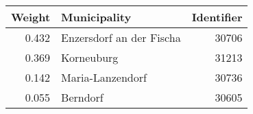 
\begin{tabular}{rlr}
\toprule
Weight & Municipality & Identifier\\
\midrule
0.432 & Enzersdorf an der Fischa & 30706\\
0.369 & Korneuburg & 31213\\
0.142 & Maria-Lanzendorf & 30736\\
0.055 & Berndorf & 30605\\
\bottomrule
\end{tabular}
